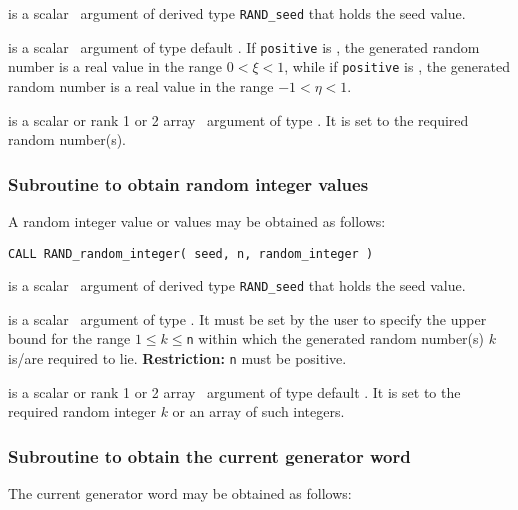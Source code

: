 \documentclass{galahad}
\newcommand{\packagename}{RAND}
\begin{document}
\vspace*{-2mm}
\begin{description}
 is a scalar \intentinout\ argument of derived type
{\tt \packagename\_seed} that holds the seed value.

 is a scalar \intentin\ argument of type default
\logical. If {\tt positive} is \true,
the generated random number is a real value in the range $0 < \xi < 1$,
while if {\tt positive} is \false, the generated random number
is a real value in the range  $-1 < \eta < 1$.

 is a scalar or rank 1 or 2 array
\intentout\ argument of type \realdp.
It is set to the required random number(s).

\end{description}


\subsubsection{Subroutine to obtain random integer values}
A random integer value or values may be obtained as follows:
\vspace*{1mm}

\hskip0.5in
{\tt CALL \packagename\_random\_integer( seed, n, random\_integer )}

\vspace*{-2mm}
\begin{description}
 is a scalar \intentinout\ argument of derived type
{\tt \packagename\_seed}  that holds the seed value.

 is a scalar \intentin\ argument of type \integer.
It must be  set by the user to specify the upper bound for the range
$1 \leq k \leq ${\tt n}  within which the generated random number(s) $k$
is/are required to lie.
{\bf Restriction:}  {\tt n} must be positive.

 is a scalar  or rank 1 or 2 array
\intentout\ argument of type default  \integer.
It is set to the required random integer $k$
or an array of such integers.

\end{description}


\subsubsection{Subroutine to obtain the current generator word}
The current generator word may be obtained as follows:
\vspace*{1mm}
\end{document}
